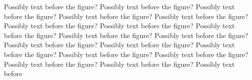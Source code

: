 


Possibly text before the figure? Possibly text before the figure? Possibly
text before the figure? Possibly text before the figure? Possibly text
before the figure? Possibly text before the figure? Possibly text before
the figure? Possibly text before the figure? Possibly text before the
figure? Possibly text before the figure? Possibly text before the figure?
Possibly text before the figure? Possibly text before the figure? Possibly
text before the figure? Possibly text before the figure? Possibly text
before the figure? Possibly text before the figure? Possibly text before

\begin{figure}[h]\addtocounter{figure}{-1}
\centerline{}
\end{figure}

